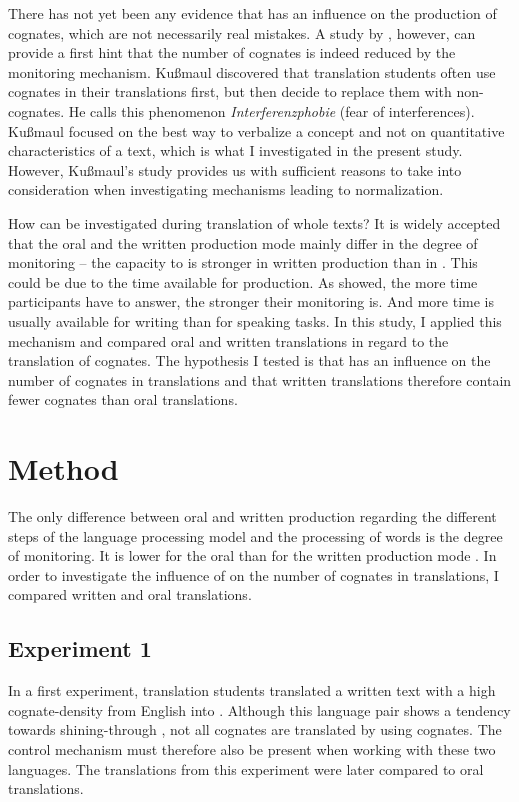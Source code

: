 \documentclass[output=paper]{LSP/langsci}
\begin{document}
There has not yet been any evidence that  has an influence on the production of cognates, which are not necessarily real mistakes. A study by \citet{Kussmaul1989}, however, can provide a first hint that the number of cognates is indeed reduced by the monitoring mechanism. Kußmaul discovered that translation students often use cognates in their translations first, but then decide to replace them with non-cognates. He calls this phenomenon \textit{Interferenzphobie} (fear of interferences). Kußmaul focused on the best way to verbalize a concept and not on quantitative characteristics of a text, which is what I investigated in the present study. However, Kußmaul's study provides us with sufficient reasons to take  into consideration when investigating mechanisms leading to normalization.

How can  be investigated during translation of whole texts? It is widely accepted that the oral and the written production mode mainly differ in the degree of monitoring -- the capacity to  is stronger in written production than in  \citep{Treiman2003}. This could be due to the time available for production. As \citet{Ganushchak2006} showed, the more time participants have to answer, the stronger their monitoring is. And more time is usually available for writing than for speaking tasks. In this study, I applied this mechanism and compared oral and written translations in regard to the translation of cognates. The hypothesis I tested is that  has an influence on the number of cognates in translations and that written translations therefore contain fewer cognates than oral translations.

\section{Method}\label{oster:sec:2}

The only difference between oral and written production regarding the different steps of the language processing model and the processing of words is the degree of monitoring. It is lower for the oral than for the written production mode \citep{Treiman2003}. In order to investigate the influence of  on the number of cognates in translations, I compared written and oral translations.

\subsection{Experiment 1}\label{oster:sec:2.1}
In a first experiment, translation students translated a written text with a high cognate-density from English into . Although this language pair shows a tendency towards shining-through \citep{Vintar2005}, not all  cognates are translated by using  cognates. The control mechanism must therefore also be present when working with these two languages. The translations from this experiment were later compared to oral translations. 
\end{document}
